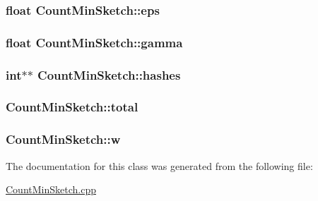 \subsubsection[{\texorpdfstring{eps}{eps}}]{\setlength{\rightskip}{0pt plus 5cm}float Count\+Min\+Sketch\+::eps\hspace{0.3cm}{\ttfamily [private]}}\hypertarget{classCountMinSketch_a71f4c0b4a1e3a75ab3f05c2774bf4ba8}{}\label{classCountMinSketch_a71f4c0b4a1e3a75ab3f05c2774bf4ba8}
\subsubsection[{\texorpdfstring{gamma}{gamma}}]{\setlength{\rightskip}{0pt plus 5cm}float Count\+Min\+Sketch\+::gamma\hspace{0.3cm}{\ttfamily [private]}}\hypertarget{classCountMinSketch_ab7449c3f4d41400fb6104a3e62ac8126}{}\label{classCountMinSketch_ab7449c3f4d41400fb6104a3e62ac8126}
\subsubsection[{\texorpdfstring{hashes}{hashes}}]{\setlength{\rightskip}{0pt plus 5cm}int$\ast$$\ast$ Count\+Min\+Sketch\+::hashes\hspace{0.3cm}{\ttfamily [private]}}\hypertarget{classCountMinSketch_abb764dbee3b01e8f35ee27c3ac71dc20}{}\label{classCountMinSketch_abb764dbee3b01e8f35ee27c3ac71dc20}
\subsubsection[{\texorpdfstring{total}{total}}]{ Count\+Min\+Sketch\+::total\hspace{0.3cm}{\ttfamily [private]}}\hypertarget{classCountMinSketch_a5a821d4e928c5d464b5388f78fc4f576}{}\label{classCountMinSketch_a5a821d4e928c5d464b5388f78fc4f576}
\subsubsection[{\texorpdfstring{w}{w}}]{ Count\+Min\+Sketch\+::w\hspace{0.3cm}{\ttfamily [private]}}\hypertarget{classCountMinSketch_a063b7a7097976a71f1eb112154977212}{}\label{classCountMinSketch_a063b7a7097976a71f1eb112154977212}


The documentation for this class was generated from the following file\+:\begin{DoxyCompactItemize}
\item 
\hyperlink{CountMinSketch_8cpp}{Count\+Min\+Sketch.\+cpp}\end{DoxyCompactItemize}
